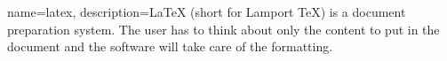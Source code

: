 {
    name=latex,
    description={LaTeX (short for Lamport TeX) is a document preparation system. The user has to think about only the content to put in the document and the software will take care of the formatting. }
}